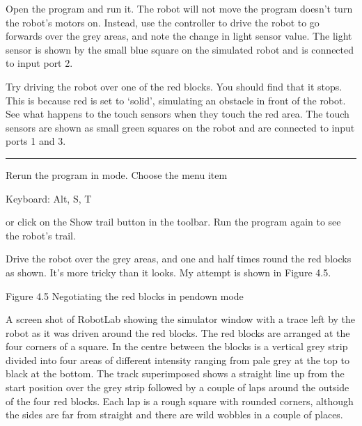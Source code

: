 \documentclass[letterpaper,10pt,english]{sphinxmanual}
\begin{document}
Open the  program and run it. The robot will not move \textendash{} the program doesn’t turn the robot’s motors on. Instead, use the controller to drive the robot to go forwards over the grey areas, and note the change in light sensor value. The light sensor is shown by the small blue square on the simulated robot and is connected to input port 2.

Try driving the robot over one of the red blocks. You should find that it stops. This is because red is set to ‘solid’, simulating an obstacle in front of the robot. See what happens to the touch sensors when they touch the red area. The touch sensors are shown as small green squares on the robot and are connected to input ports 1 and 3.


\bigskip\hrule\bigskip


Rerun the  program in  mode. Choose the  menu item





Keyboard: Alt, S, T





or click on the Show trail  button in the toolbar. Run the program again to see the robot’s trail.

Drive the robot over the grey areas, and one and half times round the red blocks as shown. It’s more tricky than it looks. My attempt is shown in Figure 4.5.

\noindent{}

Figure 4.5 Negotiating the red blocks in pen\sphinxhyphen{}down mode

A screen shot of RobotLab showing the simulator window with a trace left by the robot as it was driven around the red blocks. The red blocks are arranged at the four corners of a square. In the centre between the blocks is a vertical grey strip divided into four areas of different intensity ranging from pale grey at the top to black at the bottom. The track superimposed shows a straight line up from the start position over the grey strip followed by a couple of laps around the outside of the
four red blocks. Each lap is a rough square with rounded corners, although the sides are far from straight and there are wild wobbles in a couple of places.
\end{document}
